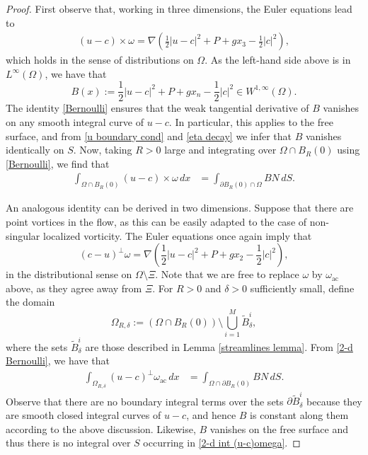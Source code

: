 \documentclass[11pt,reqno]{amsart}
\theoremstyle{plain}
\theoremstyle{remark}
\numberwithin{equation}{section}
\begin{document}
 \begin{proof}
 First observe that, working in three dimensions, the Euler equations lead to
  \begin{align}
    \label{Bernoulli}
    (u-c) \times \omega
    = \nabla\left( \frac 12 |u-c|^2 + P + gx_3 - \frac 12 |c|^2 \right),
  \end{align} 
  which holds in the sense of distributions on $\Omega$.   As the left-hand side above is in $L^\infty(\Omega)$, we have that  
 \[ B(x) := \frac{1}{2} |u-c|^2 + P + g x_n - \frac{1}{2} |c|^2 \in W^{1,\infty}(\Omega).\]
 The identity \eqref{Bernoulli} ensures that the weak tangential derivative of $B$ vanishes on any smooth integral curve of $u-c$.  In particular, this applies to the free surface, and from \eqref{u boundary cond} and \eqref{eta decay} we infer that $B$ vanishes identically on $S$.  Now, taking $R > 0$ large and integrating over $\Omega \cap B_R(0)$ using \eqref{Bernoulli}, we find that 
\begin{equation}
 \label{3-d int (u-c)omega} 
 \begin{split}
   \int_{\Omega \cap B_R(0)}  (u-c) \times \omega \, dx & = \int_{\partial B_R(0) \cap \Omega} B N \, dS.
 \end{split}
\end{equation}

An analogous identity can be derived in two dimensions.   Suppose that there are point vortices in the flow, as this can be easily adapted to the case of non-singular localized vorticity.  The Euler equations once again imply that
\begin{equation}
  \label{2-d Bernoulli}
  (c - u)^\perp \omega = \nabla \left( \frac{1}{2} |u-c|^2 + P + g x_2 - \frac{1}{2} |c|^2 \right),
\end{equation}
in the distributional sense on $\Omega \setminus \Xi$.  Note that we are free to replace $\omega$ by $\omega_{\mathrm{ac}}$ above, as they agree away from $\Xi$.   For $R > 0$ and $\delta > 0$ sufficiently small, define the domain 
\begin{equation}\label{domain}  \Omega_{R, \delta} := \left( \Omega \cap B_R(0) \right) \setminus \bigcup_{i=1}^M \tilde B_\delta^i,\end{equation}
where the sets $\tilde B_\delta^i$ are those described in Lemma \ref{streamlines lemma}.  From \eqref{2-d Bernoulli}, we have that
\begin{equation}
 \label{2-d int (u-c)omega} 
 \begin{split}
   \int_{ \Omega_{R,\delta}} (u - c)^\perp \omega_{\mathrm{ac}} \, dx & = \int_{\Omega \cap \partial B_R(0)} B N \, dS.
 \end{split}
\end{equation}
Observe that there are no boundary integral terms over the sets $\partial \tilde B_\delta^i$ because they are smooth closed integral curves of $u-c$, and hence $B$ is constant along them according to the above discussion. Likewise, $B$ vanishes on the free surface and thus there is no integral over $S$ occurring in \eqref{2-d int (u-c)omega}.  


\end{proof}
\end{document}
